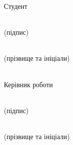 \begin{flushright}
Студент
\begin{minipage}[t][2\mytextsize][t]{2in} %
\underline{\hspace{2in}}\\ %
  \centering
  \small(підпис)
  \vspace{\mytextsize} %
\end{minipage} 
\begin{minipage}[t][2\mytextsize][t]{2in} %
\underline{\hspace{2in}}\\ %
  \centering
  \small(прізвище та ініціали)
  \vspace{\mytextsize} %
\end{minipage}
\vspace{10mm}\\
Керівник роботи
\begin{minipage}[t][2\mytextsize][t]{2in} %
\underline{\hspace{2in}}\\ %
  \centering
  \small(підпис)
  \vspace{\mytextsize} %
\end{minipage} 
\begin{minipage}[t][2\mytextsize][t]{2in} %
\underline{\hspace{2in}}\\ %
  \centering
  \small(прізвище та ініціали)
  \vspace{\mytextsize} %
\end{minipage}
\end{flushright}